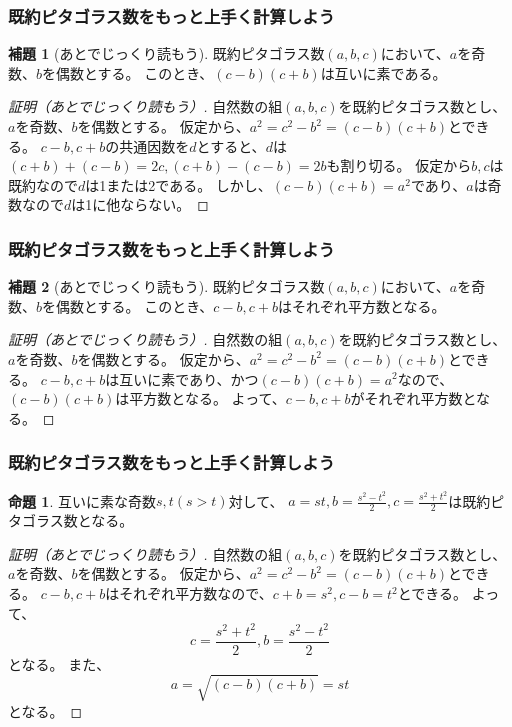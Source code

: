 \documentclass[dvipdfmx,11pt,notheorems]{beamer}
\theoremstyle{definition}
\newtheorem{proposition}{命題}
\newtheorem{lemma}{補題}
\begin{document}
\begin{frame}\frametitle{既約ピタゴラス数をもっと上手く計算しよう}
\begin{lemma}[あとでじっくり読もう]
既約ピタゴラス数$(a, b, c)$において、$a$を奇数、$b$を偶数とする。
このとき、$(c-b)(c+b)$は互いに素である。
\end{lemma}

\begin{proof}[証明（あとでじっくり読もう）]
自然数の組$(a, b, c)$を既約ピタゴラス数とし、$a$を奇数、$b$を偶数とする。
仮定から、$a^{2} = c^{2} -b^{2} = (c-b)(c+b)$とできる。
$c-b, c+b$の共通因数を$d$とすると、$d$は$(c+b)+(c-b)=2c, (c+b)-(c-b)=2b$も割り切る。
仮定から$b, c$は既約なので$d$は1または2である。
しかし、$(c-b)(c+b)=a^{2}$であり、$a$は奇数なので$d$は1に他ならない。

\end{proof}

\end{frame}

\begin{frame}\frametitle{既約ピタゴラス数をもっと上手く計算しよう}
\begin{lemma}[あとでじっくり読もう]
既約ピタゴラス数$(a, b, c)$において、$a$を奇数、$b$を偶数とする。
このとき、$c-b, c+b$はそれぞれ平方数となる。
\end{lemma}

\begin{proof}[証明（あとでじっくり読もう）]
自然数の組$(a, b, c)$を既約ピタゴラス数とし、$a$を奇数、$b$を偶数とする。
仮定から、$a^{2} = c^{2} -b^{2} = (c-b)(c+b)$とできる。
$c-b, c+b$は互いに素であり、かつ$(c-b)(c+b)=a^{2}$なので、$(c-b)(c+b)$は平方数となる。
よって、$c-b, c+b$がそれぞれ平方数となる。
\end{proof}

\end{frame}


\begin{frame}\frametitle{既約ピタゴラス数をもっと上手く計算しよう}

\begin{proposition}
互いに素な奇数$s, t (s > t)$対して、 $a = st, b = \displaystyle \frac{s^{2}-t^{2}}{2}, c = \displaystyle \frac{s^{2}+t^{2}}{2}$は既約ピタゴラス数となる。
\end{proposition}

\begin{proof}[証明（あとでじっくり読もう）]
自然数の組$(a, b, c)$を既約ピタゴラス数とし、$a$を奇数、$b$を偶数とする。
仮定から、$a^{2} = c^{2} -b^{2} = (c-b)(c+b)$とできる。
$c-b, c+b$はそれぞれ平方数なので、$c+b=s^{2}, c-b=t^{2}$とできる。
よって、
\begin{equation*}
c = \frac{s^{2} + t^{2}}{2}, b = \frac{s^{2} - t^{2}}{2}
\end{equation*}
となる。
また、
\begin{equation*}
a = \sqrt{(c-b)(c+b)} = st
\end{equation*}
となる。
\end{proof}

\end{frame}
\end{document}
